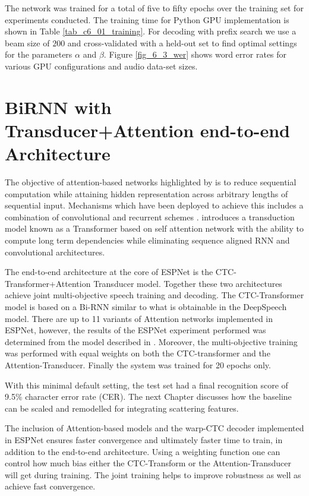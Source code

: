 The network was trained for a total of five to fifty epochs over the training set for experiments conducted. The training time for Python GPU implementation is shown in Table \ref{tab_c6_01_training}.  For decoding with prefix search we use a beam size of $200$ and cross-validated with a held-out set to find optimal settings for the parameters $\alpha$ and $\beta$. Figure \ref{fig_6_3_wer} shows word error rates for various GPU configurations and audio data-set sizes.

\startblue
\section{BiRNN with Transducer+Attention end-to-end Architecture}\label{sec_7_5_blstm_t}

The objective of attention-based networks highlighted by  \cite{vaswani2017attention} is to reduce sequential computation while attaining hidden representation across arbitrary lengths of sequential input. Mechanisms which have been deployed to achieve this includes a combination of convolutional and recurrent schemes \citep{kaiser2016can,kalchbrenner2016neural, gehring2017convolutional}. \cite{vaswani2017attention} introduces a transduction model known as a Transformer based on self attention network with the ability to compute long term dependencies while eliminating sequence aligned RNN and convolutional architectures.

The end-to-end architecture at the core of ESPNet is the CTC-Transformer+Attention Transducer model.  Together these two architectures achieve joint multi-objective speech training and decoding.  The CTC-Transformer model is based on a Bi-RNN similar to what is obtainable in the DeepSpeech model.  There are up to 11 variants of Attention networks implemented in ESPNet, however, the results of the ESPNet experiment performed was determined from the model described in \cite{chorowski2015attention}.  Moreover, the multi-objective training was performed with equal weights on both the CTC-transformer and the Attention-Transducer.  Finally the system was trained for 20 epochs only.

With this minimal default setting, the test set had a final recognition score of 9.5\% character error rate (CER).  The next Chapter discusses how the baseline can be scaled and remodelled for integrating scattering features.

The inclusion of Attention-based models and the warp-CTC decoder implemented in ESPNet ensures faster convergence and ultimately faster time to train, in addition to the end-to-end architecture.  Using a weighting function  one can control how much bias either the CTC-Transform or the Attention-Transducer will get during training.  The joint training helps to improve robustness as well as achieve fast convergence.

